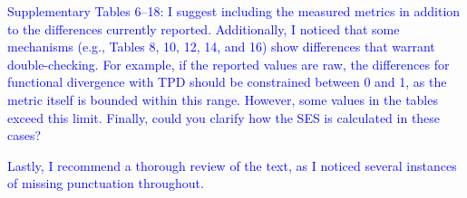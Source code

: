 \documentclass[
]{article}
\begin{document}

\textcolor{blue}{Supplementary Tables 6–18: I suggest including the measured metrics in addition to the differences currently reported.
Additionally, I noticed that some mechanisms (e.g., Tables 8, 10, 12, 14, and 16) show differences that warrant double-checking.
For example, if the reported values are raw, the differences for functional divergence with TPD should be constrained between 0 and 1, as the metric itself is bounded within this range.
However, some values in the tables exceed this limit.
Finally, could you clarify how the SES is calculated in these cases?}


\textcolor{blue}{Lastly, I recommend a thorough review of the text, as I noticed several instances of missing punctuation throughout.}
\end{document}
